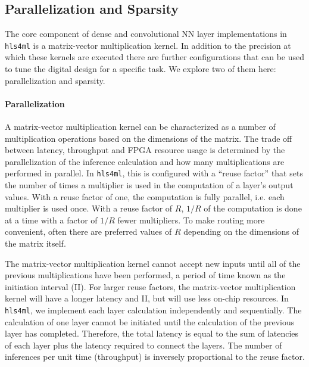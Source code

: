 \documentclass[sigconf]{acmart}
\newcommand{\hlsfml}{\texttt{hls4ml}\xspace}
\begin{document}
\subsection{Parallelization and Sparsity}
\label{sec:parallelandsparse}
The core component of dense and convolutional NN layer implementations in \hlsfml is a matrix-vector multiplication kernel.  
In addition to the precision at which these kernels are executed there are further configurations that can be used to tune the digital design for a specific task.  
We explore two of them here: parallelization and sparsity.  

\paragraph{Parallelization}

A matrix-vector multiplication kernel can be characterized as a number of multiplication operations based on the dimensions of the matrix.
The trade off between latency, throughput and FPGA resource usage is determined by the parallelization of the inference calculation and how many multiplications are performed in parallel.
In \hlsfml, this is configured with a ``reuse factor'' that sets the number of times a multiplier is used in the computation of a layer's output values.
With a reuse factor of one, the computation is fully parallel, i.e. each multiplier is used once.  
With a reuse factor of $R$, $1/R$ of the computation is done at a time with a factor of $1/R$ fewer multipliers. 
To make routing more convenient, often there are preferred values of $R$ depending on the dimensions of the matrix itself.  

The matrix-vector multiplication kernel cannot accept new inputs until all of the previous multiplications have been performed, a period of time known as the initiation interval (II).
For larger reuse factors, the matrix-vector multiplication kernel will have a longer latency and II, but will use less on-chip resources.  
In \hlsfml, we implement each layer calculation independently and sequentially.
The calculation of one layer cannot be initiated until the calculation of the previous layer has completed.  
Therefore, the total latency is equal to the sum of latencies of each layer plus the latency required to connect the layers.
The number of inferences per unit time (throughput) is inversely proportional to the reuse factor.  
\end{document}
